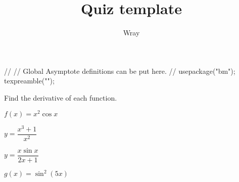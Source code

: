 \documentclass[addpoints, 12pt]{exam}
\title{Quiz template}
\author{Wray}
\begin{document}
\begin{asydef}
//
// Global Asymptote definitions can be put here.
//
usepackage("bm");
texpreamble("\def\V#1{\bm{#1}}");
\end{asydef}



\bigskip

             
\bigskip
\bigskip
Find the derivative of each function.  

\begin{questions}

\question[5]
$f(x) = x^2 \cos x$

\question[5]
$y = \dfrac{x^3 + 1}{x^2}$

\clearpage

\question[5]
$y = \dfrac{x \sin x}{2x + 1}$

\question[5]
$g(x) = \sin^2 \left( 5x \right)$

\end{questions}
\end{document}
